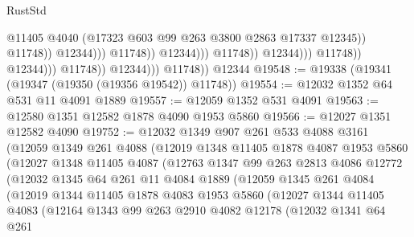 \begin{lexlean}{RustStd}
\begin{coremodule}
{\begin{coremodule}
{{{{{{{{{{{{{{{{{{{{{{{{{{{{{                                                            @11405
                                                            @4040
                                                            (@17323
                                                              @603
                                                              @99
                                                              @263
                                                              @3800
                                                              @2863
                                                              @17337
                                                              @12345))
                                                          @11748))
                                                      @12344)))
                                                @11748))
                                            @12344)))
                                      @11748))
                                  @12344)))
                            @11748))
                        @12344)))
                  @11748))
              @12344)))
        @11748))
    @12344
@19548 := @19338 (@19341 (@19347 (@19350 (@19356 @19542)) @11748))
@19554 := @12032 @1352 @64 @531 @11 @4091 @1889
@19557 := @12059 @1352 @531 @4091
@19563 := @12580 @1351 @12582 @1878 @4090 @1953 @5860
@19566 := @12027 @1351 @12582 @4090
@19752 := @12032
    @1349
    @907
    @261
    @533
    @4088
    @3161
    (@12059
      @1349
      @261
      @4088
      (@12019
        @1348
        @11405
        @1878
        @4087
        @1953
        @5860
        (@12027
          @1348
          @11405
          @4087
          (@12763
            @1347
            @99
            @263
            @2813
            @4086
            @12772
            (@12032
              @1345
              @64
              @261
              @11
              @4084
              @1889
              (@12059
                @1345
                @261
                @4084
                (@12019
                  @1344
                  @11405
                  @1878
                  @4083
                  @1953
                  @5860
                  (@12027
                    @1344
                    @11405
                    @4083
                    (@12164
                      @1343
                      @99
                      @263
                      @2910
                      @4082
                      @12178
                      (@12032
                        @1341
                        @64
                        @261
}}}}}}}}}}}}}}}}}}}}}}}}}}}}}
\end{coremodule}}
\end{coremodule}
\end{lexlean}
